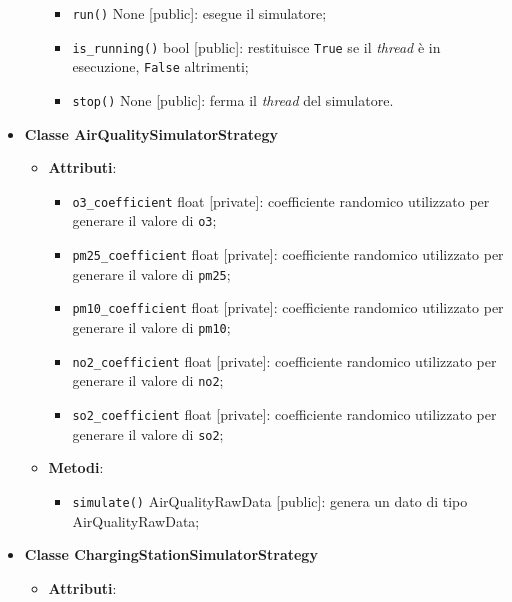 \begin{itemize}
\begin{itemize}
		            \begin{itemize}
			            \item \texttt{run()} None [public]: esegue il simulatore;
			            \item \texttt{is\_running()} bool [public]: restituisce \texttt{True} se il \textit{thread} è in esecuzione, \texttt{False} altrimenti;
			            \item \texttt{stop()} None [public]: ferma il \textit{thread} del simulatore.
		            \end{itemize}
	      \end{itemize}
	\item \textbf{Classe AirQualitySimulatorStrategy}
	      \begin{itemize}
		      \item \textbf{Attributi}:
		            \begin{itemize}
			            \item \texttt{o3\_coefficient} float [private]: coefficiente randomico utilizzato per generare il valore di \texttt{o3};
			            \item \texttt{pm25\_coefficient} float [private]: coefficiente randomico utilizzato per generare il valore di \texttt{pm25};
			            \item \texttt{pm10\_coefficient} float [private]: coefficiente randomico utilizzato per generare il valore di \texttt{pm10};
			            \item \texttt{no2\_coefficient} float [private]: coefficiente randomico utilizzato per generare il valore di \texttt{no2};
			            \item \texttt{so2\_coefficient} float [private]: coefficiente randomico utilizzato per generare il valore di \texttt{so2};
		            \end{itemize}
		      \item \textbf{Metodi}:
		            \begin{itemize}
			            \item \texttt{simulate()} AirQualityRawData [public]: genera un dato di tipo AirQualityRawData;
		            \end{itemize}
	      \end{itemize}
	\item \textbf{Classe ChargingStationSimulatorStrategy}
	      \begin{itemize}
		      \item \textbf{Attributi}:
		            \begin{itemize}

\end{itemize}
\end{itemize}
\end{itemize}
